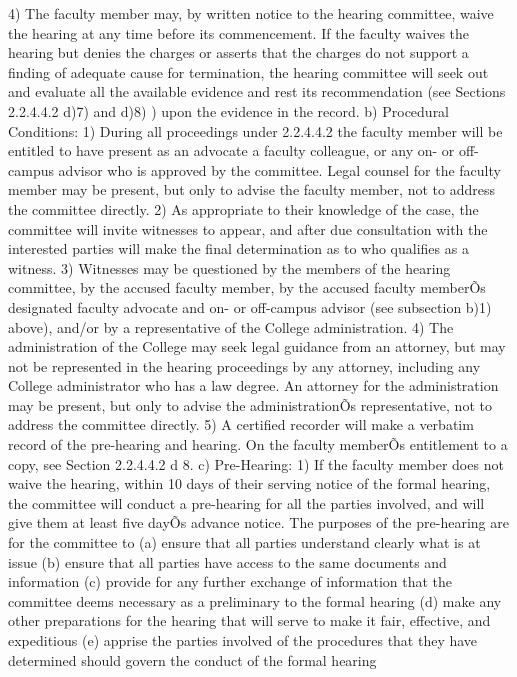 \documentclass[letterpaper, 11pt]{article}
\begin{document}
				4) The faculty member may, by written notice to the hearing committee, waive the hearing at any time before its commencement.  If the faculty waives the hearing but denies the charges or asserts that the charges do not support a finding of adequate cause for termination, the hearing committee will seek out and evaluate all the available evidence and rest its recommendation (see Sections 2.2.4.4.2 d)7) and d)8) ) upon the evidence in the record.
				b) Procedural Conditions:
				1) During all proceedings under 2.2.4.4.2 the faculty member will be entitled to have present as an advocate a faculty colleague, or any on- or off-campus advisor who is approved by the committee.  Legal counsel for the faculty member may be present, but only to advise the faculty member, not to address the committee directly.
				2) As appropriate to their knowledge of the case, the committee will invite witnesses to appear, and after due consultation with the interested parties will make the final determination as to who qualifies as a witness.
				3) Witnesses may be questioned by the members of the hearing committee, by the accused faculty member, by the accused faculty memberÕs designated faculty advocate and on- or off-campus advisor (see subsection b)1) above), and/or by a representative of the College administration.
				4) The administration of the College may seek legal guidance from an attorney, but may not be represented in the hearing proceedings by any attorney, including any College administrator who has a law degree.  An attorney for the administration may be present, but only to advise the administrationÕs representative, not to address the committee directly.
				5) A certified recorder will make a verbatim record of the pre-hearing and hearing.
					{On the faculty memberÕs entitlement to a copy, see Section 2.2.4.4.2 d 8. }
				c) Pre-Hearing:
				1) If the faculty member does not waive the hearing, within 10 days of their serving notice of the formal hearing, the committee will conduct a pre-hearing for all the parties involved, and will give them at least five dayÕs advance notice.  The purposes of the pre-hearing are for the committee to
				(a) ensure that all parties understand clearly what is at issue
				(b) ensure that all parties have access to the same documents and information
				(c) provide for any further exchange of information that the committee deems necessary as a preliminary to the formal hearing
				(d) make any other preparations for the hearing that will serve to make it fair, effective, and expeditious
				(e) apprise the parties involved of the procedures that they have determined should govern the conduct of the formal hearing
\end{document}
